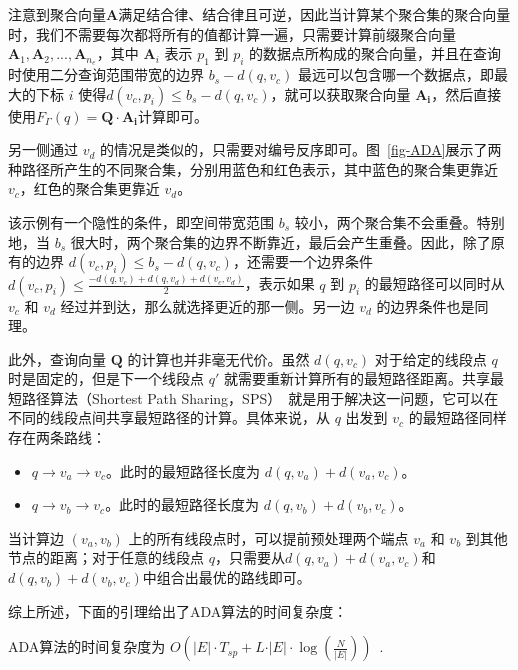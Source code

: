 注意到聚合向量$\mathbf{A}$满足结合律、结合律且可逆，因此当计算某个聚合集的聚合向量时，我们不需要每次都将所有的值都计算一遍，只需要计算前缀聚合向量$\mathbf{A}_1, \mathbf{A}_2, ... ,\mathbf{A}_{n_e}$，其中 $\mathbf{A}_i$ 表示 $p_1$ 到 $p_i$ 的数据点所构成的聚合向量，并且在查询时使用二分查询范围带宽的边界 $b_s - d(q, v_c)$ 最远可以包含哪一个数据点，即最大的下标 $i$ 使得$d(v_c, p_i) \le b_s - d(q, v_c)$，就可以获取聚合向量 $\mathbf{A_i}$，然后直接使用$F_\Gamma(q) = \mathbf{Q} \cdot \mathbf{A_i}$计算即可。

另一侧通过 $v_d$ 的情况是类似的，只需要对编号反序即可。图~\ref{fig-ADA}展示了两种路径所产生的不同聚合集，分别用蓝色和红色表示，其中蓝色的聚合集更靠近 $v_c$，红色的聚合集更靠近 $v_d$。

该示例有一个隐性的条件，即空间带宽范围 $b_s$ 较小，两个聚合集不会重叠。特别地，当 $b_s$ 很大时，两个聚合集的边界不断靠近，最后会产生重叠。因此，除了原有的边界 $d(v_c, p_i) \le b_s - d(q, v_c)$，还需要一个边界条件 $d(v_c, p_i) \le \frac{- d(q, v_c) + d(q, v_d) + d(v_c, v_d)}{2}$，表示如果 $q$ 到 $p_i$ 的最短路径可以同时从 $v_c$ 和 $v_d$ 经过并到达，那么就选择更近的那一侧。另一边 $v_d$ 的边界条件也是同理。

此外，查询向量 $\textbf{Q}$ 的计算也并非毫无代价。虽然 $d(q, v_c)$ 对于给定的线段点 $q$ 时是固定的，但是下一个线段点 $q'$ 就需要重新计算所有的最短路径距离。共享最短路径算法（Shortest Path Sharing，SPS）~\cite{rakshit2019efficient}就是用于解决这一问题，它可以在不同的线段点间共享最短路径的计算。具体来说，从 $q$ 出发到 $v_c$ 的最短路径同样存在两条路线：
\begin{itemize}
	\item $q \rightarrow v_a \rightarrow v_c$。此时的最短路径长度为 $d(q, v_a) + d(v_a, v_c)$。
	\item $q \rightarrow v_b \rightarrow v_c$。此时的最短路径长度为 $d(q, v_b) + d(v_b, v_c)$。
\end{itemize}
当计算边 $(v_a, v_b)$ 上的所有线段点时，可以提前预处理两个端点 $v_a$ 和 $v_b$ 到其他节点的距离；对于任意的线段点 $q$，只需要从$d(q, v_a) + d(v_a, v_c)$和$d(q, v_b) + d(v_b, v_c)$中组合出最优的路线即可。

综上所述，下面的引理给出了ADA算法的时间复杂度：

\begin{lemma}
	\label{lemma:ADA}
	ADA算法的时间复杂度为 $O(\vert E \vert \cdot T_{sp} + L \cdot \vert E \vert \cdot \log(\frac{N}{\vert E \vert}))$~\cite{chan_fast_2021}.
\end{lemma}

